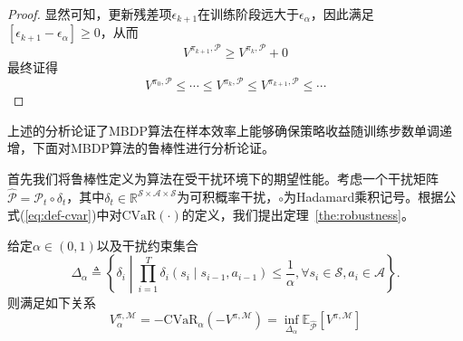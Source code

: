 \begin{proof}
显然可知，更新残差项$\epsilon_{k+1}$在训练阶段远大于$\epsilon_\alpha$，因此满足 $\left[\epsilon_{k+1} - \epsilon_\alpha\right]\geq 0$，从而
\begin{equation}
{V}^{\pi_{k+1}, \mathcal{P}}\geq{V}^{\pi_{k}, \mathcal{P}}+0 
\end{equation}
最终证得
\begin{equation}
{V}^{\pi_{0}, \mathcal{P}} \leq \cdots \leq {V}^{\pi_{k}, \mathcal{P}} \leq {V}^{\pi_{k+1}, \mathcal{P}} \leq \cdots
\end{equation}

\end{proof}

上述的分析论证了MBDP算法在样本效率上能够确保策略收益随训练步数单调递增，下面对MBDP算法的鲁棒性进行分析论证。

首先我们将鲁棒性定义为算法在受干扰环境下的期望性能。考虑一个干扰矩阵$\hat{\mathcal{P}}=\mathcal{P}_t \circ \delta_t$，其中$\delta_t\in\mathbb{R}^{\mathcal{S}\times\mathcal{A}\times\mathcal{S}}$为可积概率干扰，$\circ$为Hadamard乘积记号。根据公式(\ref{eq:def-cvar})中对$\mathrm{CVaR}(\cdot)$的定义，我们提出定理~\ref{the:robustness}。

\begin{theorem}\label{the:robustness}
给定$\alpha\in(0,1)$以及干扰约束集合
\begin{equation}\label{eq:supp-perturbation}
    \Delta_\alpha \triangleq \left\{\delta_i\middle\vert\prod_{i=1}^{T}\delta_i(s_i\mid s_{i-1},a_{i-1})\leq \frac{1}{\alpha}, \forall s_i\in\mathcal{S}, a_i\in\mathcal{A}\right\}.
\end{equation}
则满足如下关系
\begin{equation}\label{eq:return-cvar-rob}
    V_\alpha^{\pi,\mathcal{M}} = -\mathrm{CVaR}_\alpha(-V^{\pi,\mathcal{M}})=\inf\limits_{\Delta_\alpha}\mathbb{E}_{\hat{\mathcal{P}}}[V^{\pi,\mathcal{M}}]
\end{equation}
\end{theorem}

